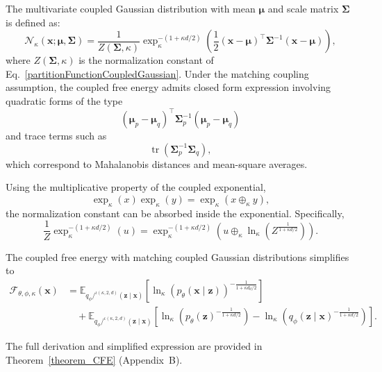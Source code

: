 \documentclass[twoside,11pt]{article}
\begin{document}
The multivariate coupled Gaussian distribution with mean $\boldsymbol{\mu}$ and scale matrix $\boldsymbol{\Sigma}$ is defined as:
\begin{equation}
\mathcal{N}_{\kappa}(\mathbf{x};\boldsymbol{\mu},\boldsymbol{\Sigma})
=\frac{1}{Z(\boldsymbol{\Sigma}, \kappa)}\exp_{\kappa}^{-(1+\kappa d/2)}\!\left(\frac{1}{2}
(\mathbf{x}-\boldsymbol{\mu})^{\top}\boldsymbol{\Sigma}^{-1}(\mathbf{x}-\boldsymbol{\mu})\right),
\end{equation}
where $Z(\boldsymbol{\Sigma},\kappa)$ is the normalization constant of Eq.~\eqref{partitionFunctionCoupledGaussian}. Under the matching coupling assumption, the coupled free energy admits closed form expression involving quadratic forms of the type
\[
(\boldsymbol{\mu}_p - \boldsymbol{\mu}_q)^\top
\boldsymbol{\Sigma}_p^{-1}
(\boldsymbol{\mu}_p - \boldsymbol{\mu}_q)
\]
and trace terms such as
\[
\operatorname{tr}(\boldsymbol{\Sigma}_p^{-1}\boldsymbol{\Sigma}_q),
\]
which correspond to Mahalanobis distances and mean-square averages. 

Using the multiplicative property of the coupled exponential, 
\[
\exp_\kappa(x)\exp_\kappa(y)=
\exp_\kappa(x \oplus_\kappa y),
\]
the normalization constant can be absorbed inside the exponential. Specifically,
\[
\frac{1}{Z}\exp_{\kappa}^{-(1+\kappa d/2)}(u)=\exp_{\kappa}^{-(1+\kappa d/2)}
\left(u \oplus_{\kappa} \ln_{\kappa}\left(Z^\frac{1}{1+\kappa d/2}\right)
\right).
\]

The coupled free energy with matching coupled Gaussian  distributions simplifies to 
\begin{align}
\mathcal{F}_{\theta,\phi,\kappa}(\mathbf{x})
&= \mathbb{E}_{q_\phi/^{\iota(\kappa,2,d)}(\mathbf{z}\mid \mathbf{x})}\left[\ln_{\kappa}\left(
p_\theta(\mathbf{x}\mid \mathbf{z})
\right)^{-\frac{1}{1+\kappa d_d/2}}\right]
\\
&\quad+ \mathbb{E}_{q_\phi/^{\iota(\kappa,2,d)}(\mathbf{z}\mid\mathbf{x})}
\left[\ln_{\kappa}\left(
p_\theta(\mathbf{z})^{-\frac{1}{1+\kappa d/2}}\right) - \ln_{\kappa}
\left(q_\phi(\mathbf{z}\mid \mathbf{x})^{-\frac{1}{1+\kappa d/2}}\right)\right].
\end{align}

The full derivation and simplified expression are provided in Theorem~\ref{theorem_CFE} (Appendix~B).
\end{document}
